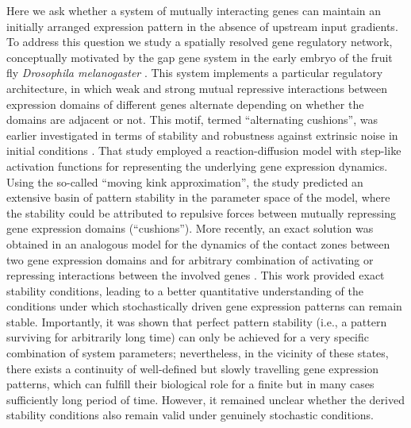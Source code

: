 \documentclass[a4paper,10pt]{article}
\begin{document}
Here we ask whether a system of mutually interacting genes can maintain an initially arranged expression pattern in the absence of upstream input gradients. To address this question we study a spatially resolved gene regulatory network, conceptually motivated by the gap gene system in the early embryo of the fruit fly {\it Drosophila melanogaster} \cite{Jaeger2004, Jaeger2011, Dubuis2013, Manu2009PlosBiol, Surkova2008, Clyde2003}.
This system implements a particular regulatory architecture, 
in which weak and strong mutual repressive interactions between expression domains of different genes alternate depending on whether the domains are adjacent or not.
This motif, termed ``alternating cushions'', was earlier investigated in terms of stability and robustness against extrinsic noise in initial conditions \cite{Vakulenko2009}. That study employed a reaction-diffusion model with step-like activation functions for representing the underlying gene expression dynamics. Using the so-called ``moving kink approximation'', the study predicted an extensive basin of pattern stability in the parameter space of the model, where the stability could be attributed to repulsive forces between mutually repressing gene expression domains (``cushions''). More recently, an exact solution was obtained in an analogous model for the dynamics of the contact zones between two gene expression domains and for arbitrary combination of activating or repressing interactions between the involved genes \cite{Majka2023}. This work provided exact stability conditions, leading to a better quantitative understanding of the conditions under which stochastically driven gene expression patterns can remain stable. Importantly, it was shown that perfect pattern stability (i.e., a pattern surviving for arbitrarily long time) can only be achieved for a very specific combination of system parameters; nevertheless, in the vicinity of these states, there exists a continuity of well-defined but slowly travelling gene expression patterns, which can fulfill their biological role for a finite but in many cases sufficiently long period of time. However, it remained unclear whether the derived stability conditions also remain valid under genuinely stochastic conditions.
\end{document}
